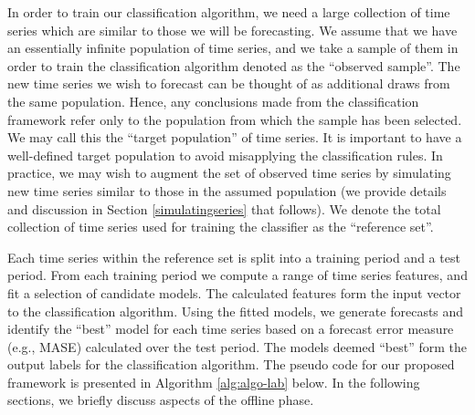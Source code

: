 \documentclass[11pt,a4paper,]{article}
\begin{document}
In order to train our classification algorithm, we need a large collection of time series which are similar to those we will be forecasting. We assume that we have an essentially infinite population of time series, and we take a sample of them in order to train the classification algorithm denoted as the ``observed sample''. The new time series we wish to forecast can be thought of as additional draws from the same population. Hence, any conclusions made from the classification framework refer only to the population from which the sample has been selected. We may call this the ``target population'' of time series. It is important to have a well-defined target population to avoid misapplying the classification rules. In practice, we may wish to augment the set of observed time series by simulating new time series similar to those in the assumed population (we provide details and discussion in Section \ref{simulatingseries} that follows). We denote the total collection of time series used for training the classifier as the ``reference set''.

Each time series within the reference set is split into a training period and a test period. From each training period we compute a range of time series features, and fit a selection of candidate models. The calculated features form the input vector to the classification algorithm. Using the fitted models, we generate forecasts and identify the ``best'' model for each time series based on a forecast error measure (e.g., MASE) calculated over the test period. The models deemed ``best'' form the output labels for the classification algorithm. The pseudo code for our proposed framework is presented in Algorithm \ref{alg:algo-lab} below. In the following sections, we briefly discuss aspects of the offline phase.
\end{document}
